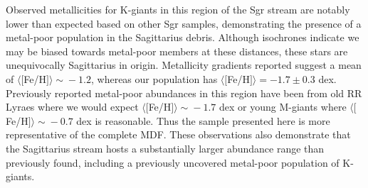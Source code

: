 \documentclass[preprint2]{aastex}
\begin{document}
	Observed metallicities for K-giants in this region of the Sgr stream are notably lower than expected based on other Sgr samples, demonstrating the presence of a metal-poor population in the  Sagittarius debris. Although isochrones indicate we may be biased towards metal-poor members at these distances, these stars are unequivocally Sagittarius in origin. Metallicity gradients reported suggest a mean of $\langle[$Fe/H$]\rangle\sim{}-1.2$, whereas our population has $\langle[$Fe/H$]\rangle = -1.7 \pm 0.3$ dex. Previously reported metal-poor abundances in this region have been from old RR Lyraes where we would expect $\langle[$Fe/H$]\rangle\sim{}-1.7$ dex or young M-giants where $\langle[$Fe/H$]\rangle\sim{}-0.7$ dex is reasonable. Thus the sample presented here is more representative of the complete MDF. These observations also demonstrate that the Sagittarius stream hosts a substantially larger abundance range than previously found, including a previously uncovered metal-poor population of K-giants.
	
\end{document}
